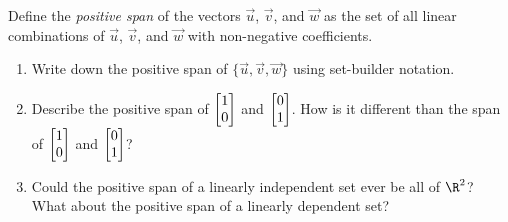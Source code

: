\begin{enumerate}
		Define the \emph{positive span} of the vectors $\vec u$, $\vec v$, and $\vec w$ as the set of all
		linear combinations of $\vec u$, $\vec v$, and $\vec w$ with non-negative coefficients.

		\begin{enumerate}
			\item Write down the positive span of $\{\vec u,\vec v,\vec w\}$ using set-builder notation.
			\item Describe the positive span of $\mat{1\\0}$ and $\mat{0\\1}$. How is it different than
				the span of $\mat{1\\0}$ and $\mat{0\\1}$?
			\item Could the positive span of a linearly independent set ever be all of $\R^2$? What about the
				positive span of a linearly dependent set?
		\end{enumerate}
	
\end{enumerate}
